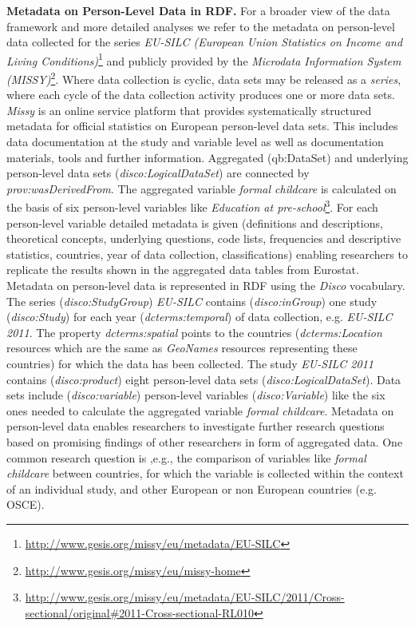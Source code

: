 \documentclass{llncs}
\begin{document}
\textbf{Metadata on Person-Level Data in RDF.}
For a broader view of the data framework and more detailed analyses we refer to the metadata on person-level data collected for the series \emph{EU-SILC (European Union Statistics on Income and Living Conditions)}\footnote{\url{http://www.gesis.org/missy/eu/metadata/EU-SILC}} 
and publicly provided by the \emph{Microdata Information System (MISSY)}\footnote{\url{http://www.gesis.org/missy/eu/missy-home}}.
Where data collection is cyclic, data sets may be released as a \emph{series}, 
where each cycle of the data collection activity produces one or more data sets. 
\emph{Missy} is an online service platform that provides systematically structured metadata for official statistics on European person-level data sets. This includes data documentation at the study and variable level as well as documentation materials, tools and further information. 
Aggregated (qb:DataSet) and underlying person-level data sets (\emph{disco:LogicalDataSet}) are connected by \emph{prov:wasDerivedFrom}. 
The aggregated variable \emph{formal childcare} is calculated on the basis of six person-level variables like 
\emph{Education at pre-school}\footnote{\url{http://www.gesis.org/missy/eu/metadata/EU-SILC/2011/Cross-sectional/original#2011-Cross-sectional-RL010}}.
For each person-level variable detailed metadata is given (definitions and descriptions, theoretical concepts, underlying questions, code lists, frequencies and descriptive statistics, countries, year of data collection, classifications) enabling researchers to replicate the results shown in the aggregated data tables from Eurostat.
Metadata on person-level data is represented in RDF using the \emph{Disco} vocabulary.
The series (\emph{disco:StudyGroup}) \emph{EU-SILC} contains (\emph{disco:inGroup}) one study (\emph{disco:Study}) for each year (\emph{dcterms:temporal}) of data collection, e.g. \emph{EU-SILC 2011}.   
The property \emph{dcterms:spatial} points to the countries (\emph{dcterms:Location} resources which are the same as \emph{GeoNames} resources representing these countries) for which the data has been collected.
The study \emph{EU-SILC 2011} contains (\emph{disco:product}) eight person-level data sets (\emph{disco:LogicalDataSet}).
Data sets include (\emph{disco:variable}) person-level variables (\emph{disco:Variable}) like the six ones needed to calculate the aggregated variable \emph{formal childcare}.
Metadata on person-level data enables researchers to investigate further research questions based on promising findings of other researchers in form of aggregated data.
One common research question is ,e.g., the comparison of variables like 
\emph{formal childcare} between countries, for which the variable is collected within the context of an individual study, and other European or non European countries (e.g. OSCE).
\end{document}
